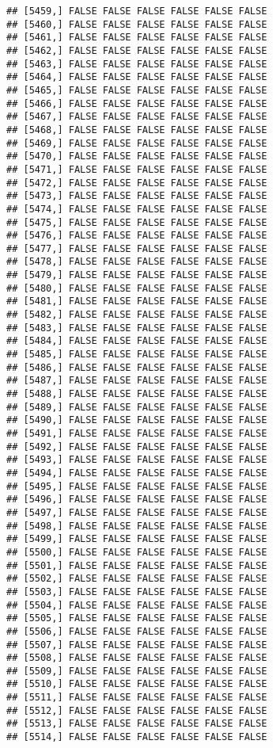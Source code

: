 \documentclass[
]{article}
\begin{document}
\begin{verbatim}
## [5459,] FALSE FALSE FALSE FALSE FALSE FALSE
## [5460,] FALSE FALSE FALSE FALSE FALSE FALSE
## [5461,] FALSE FALSE FALSE FALSE FALSE FALSE
## [5462,] FALSE FALSE FALSE FALSE FALSE FALSE
## [5463,] FALSE FALSE FALSE FALSE FALSE FALSE
## [5464,] FALSE FALSE FALSE FALSE FALSE FALSE
## [5465,] FALSE FALSE FALSE FALSE FALSE FALSE
## [5466,] FALSE FALSE FALSE FALSE FALSE FALSE
## [5467,] FALSE FALSE FALSE FALSE FALSE FALSE
## [5468,] FALSE FALSE FALSE FALSE FALSE FALSE
## [5469,] FALSE FALSE FALSE FALSE FALSE FALSE
## [5470,] FALSE FALSE FALSE FALSE FALSE FALSE
## [5471,] FALSE FALSE FALSE FALSE FALSE FALSE
## [5472,] FALSE FALSE FALSE FALSE FALSE FALSE
## [5473,] FALSE FALSE FALSE FALSE FALSE FALSE
## [5474,] FALSE FALSE FALSE FALSE FALSE FALSE
## [5475,] FALSE FALSE FALSE FALSE FALSE FALSE
## [5476,] FALSE FALSE FALSE FALSE FALSE FALSE
## [5477,] FALSE FALSE FALSE FALSE FALSE FALSE
## [5478,] FALSE FALSE FALSE FALSE FALSE FALSE
## [5479,] FALSE FALSE FALSE FALSE FALSE FALSE
## [5480,] FALSE FALSE FALSE FALSE FALSE FALSE
## [5481,] FALSE FALSE FALSE FALSE FALSE FALSE
## [5482,] FALSE FALSE FALSE FALSE FALSE FALSE
## [5483,] FALSE FALSE FALSE FALSE FALSE FALSE
## [5484,] FALSE FALSE FALSE FALSE FALSE FALSE
## [5485,] FALSE FALSE FALSE FALSE FALSE FALSE
## [5486,] FALSE FALSE FALSE FALSE FALSE FALSE
## [5487,] FALSE FALSE FALSE FALSE FALSE FALSE
## [5488,] FALSE FALSE FALSE FALSE FALSE FALSE
## [5489,] FALSE FALSE FALSE FALSE FALSE FALSE
## [5490,] FALSE FALSE FALSE FALSE FALSE FALSE
## [5491,] FALSE FALSE FALSE FALSE FALSE FALSE
## [5492,] FALSE FALSE FALSE FALSE FALSE FALSE
## [5493,] FALSE FALSE FALSE FALSE FALSE FALSE
## [5494,] FALSE FALSE FALSE FALSE FALSE FALSE
## [5495,] FALSE FALSE FALSE FALSE FALSE FALSE
## [5496,] FALSE FALSE FALSE FALSE FALSE FALSE
## [5497,] FALSE FALSE FALSE FALSE FALSE FALSE
## [5498,] FALSE FALSE FALSE FALSE FALSE FALSE
## [5499,] FALSE FALSE FALSE FALSE FALSE FALSE
## [5500,] FALSE FALSE FALSE FALSE FALSE FALSE
## [5501,] FALSE FALSE FALSE FALSE FALSE FALSE
## [5502,] FALSE FALSE FALSE FALSE FALSE FALSE
## [5503,] FALSE FALSE FALSE FALSE FALSE FALSE
## [5504,] FALSE FALSE FALSE FALSE FALSE FALSE
## [5505,] FALSE FALSE FALSE FALSE FALSE FALSE
## [5506,] FALSE FALSE FALSE FALSE FALSE FALSE
## [5507,] FALSE FALSE FALSE FALSE FALSE FALSE
## [5508,] FALSE FALSE FALSE FALSE FALSE FALSE
## [5509,] FALSE FALSE FALSE FALSE FALSE FALSE
## [5510,] FALSE FALSE FALSE FALSE FALSE FALSE
## [5511,] FALSE FALSE FALSE FALSE FALSE FALSE
## [5512,] FALSE FALSE FALSE FALSE FALSE FALSE
## [5513,] FALSE FALSE FALSE FALSE FALSE FALSE
## [5514,] FALSE FALSE FALSE FALSE FALSE FALSE

\end{verbatim}
\end{document}
